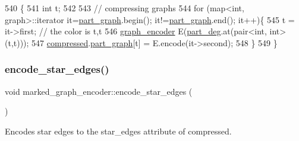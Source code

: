 \begin{DoxyCode}
540 \{
541   \textcolor{keywordtype}{int} t;
542 
543   \textcolor{comment}{// compressing graphs}
544   \textcolor{keywordflow}{for} (map<int, graph>::iterator it=\hyperlink{classmarked__graph__encoder_adbafd0769ae301acc1b2c19b5e1d4844}{part\_graph}.begin(); it!=\hyperlink{classmarked__graph__encoder_adbafd0769ae301acc1b2c19b5e1d4844}{part\_graph}.end(); it++)\{
545     t = it->first; \textcolor{comment}{// the color is t,t}
546     \hyperlink{classgraph__encoder}{graph\_encoder} E(\hyperlink{classmarked__graph__encoder_a55ea2edb2609dfc287432f61900d6ad1}{part\_deg}.at(pair<int, int>(t,t)));
547     \hyperlink{classmarked__graph__encoder_ac2ded200860fdd2321f86dd76b28bcb3}{compressed}.\hyperlink{classmarked__graph__compressed_ae179a4737e6eab905c18a94d44ef64b7}{part\_graph}[t] = E.encode(it->second);
548   \}
549 \}
\end{DoxyCode}
\mbox{\label{classmarked__graph__encoder_ad6883669a47d24e3d9898978f3252727}} 
\subsubsection{\texorpdfstring{encode\+\_\+star\+\_\+edges()}{encode\_star\_edges()}}
{\footnotesize\ttfamily void marked\+\_\+graph\+\_\+encoder\+::encode\+\_\+star\+\_\+edges (\begin{DoxyParamCaption}{ }\end{DoxyParamCaption})\hspace{0.3cm}{\ttfamily [private]}}



Encodes star edges to the star\+\_\+edges attribute of compressed. 


